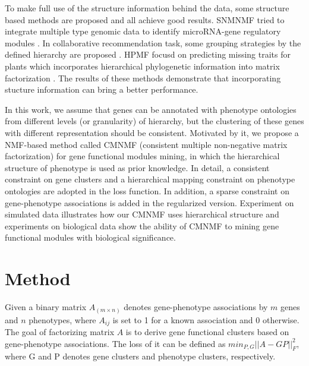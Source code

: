 \documentclass{bmcart}
\begin{document}
To make full use of the structure information behind the data, some structure based methods are proposed and all achieve good results. SNMNMF tried to integrate multiple type genomic data to identify microRNA-gene regulatory modules \cite{SMNMF}. In collaborative recommendation task, some grouping strategies by the defined hierarchy are proposed \cite{SoRec,HMF,HGMF}. HPMF focusd on predicting missing traits for plants which incorporates hierarchical phylogenetic information into matrix factorization \cite{HPMF}. The results of these methods demonstrate that incorporating stucture information can bring a better performance.

In this work, we assume that genes can be annotated with phenotype ontologies from different levels (or granularity) of hierarchy, but the clustering of these genes with different representation should be consistent. Motivated by it, we propose a NMF-based method called CMNMF (consistent multiple non-negative matrix factorization) for gene functional modules mining, in which the hierarchical structure of phenotype is used as prior knowledge. In detail, a consistent constraint on gene clusters and a hierarchical mapping constraint on phenotype ontologies are adopted in the loss function. In addition, a sparse constraint on gene-phenotype associations is added in the regularized version. Experiment on simulated data illustrates how our CMNMF uses hierarchical structure and experiments on biological data show the ability of CMNMF to mining gene functional modules with biological significance.


\section*{Method}
Given a binary matrix $A_{(m \times n)}$ denotes gene-phenotype associations by $m$ genes and $n$ phenotypes, where $A_{ij}$ is set to 1 for a known association and 0 otherwise. The goal of factorizing matrix $A$ is to derive gene functional clusters based on gene-phenotype associations. The loss of it can be defined as $min _{P,G} ||A-GP||^{2}_{F}$, where G and P denotes gene clusters and phenotype clusters, respectively.
\end{document}
